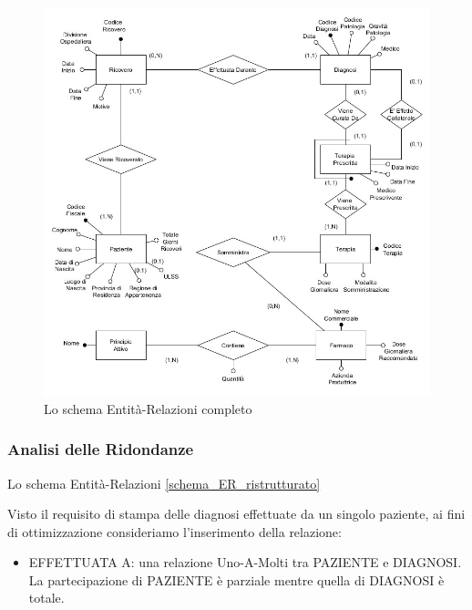 \documentclass{article}
\begin{document}
\begin{figure}[H] %
  \centering
  \includegraphics[width=\linewidth]{schema2.jpg}
  \caption{Lo schema Entità-Relazioni completo}
  \label{schema_ER_ristrutturato}
\end{figure}



\clearpage
\subsubsection{Analisi delle Ridondanze}

Lo schema Entità-Relazioni  \autoref{schema_ER_ristrutturato} %


Visto il requisito di stampa delle diagnosi effettuate da un singolo paziente, ai fini di ottimizzazione consideriamo l'inserimento della relazione:
\begin{itemize}
\item EFFETTUATA A: una relazione Uno-A-Molti tra PAZIENTE 
          e DIAGNOSI. La partecipazione di PAZIENTE è parziale mentre quella
          di DIAGNOSI è totale. 
\end{itemize}
\end{document}

